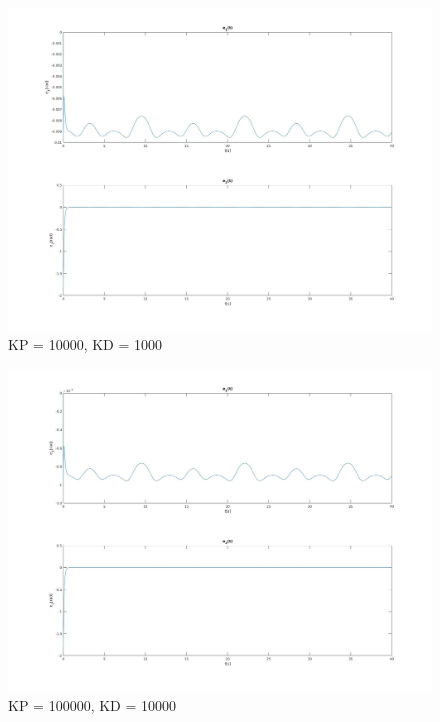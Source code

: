 \documentclass[12pt,a4paper]{article}
\begin{document}
  \begin{figure}[ht]
    \centering
    \includegraphics[width=1\textwidth]{figures/qui10000.jpg}
    \caption{KP = 10000, KD = 1000}
  \end{figure}

  \begin{figure}[ht]
    \centering
    \includegraphics[width=1\textwidth]{figures/qui100000.jpg}
    \caption{KP = 100000, KD = 10000}
  \end{figure}

\end{document}
